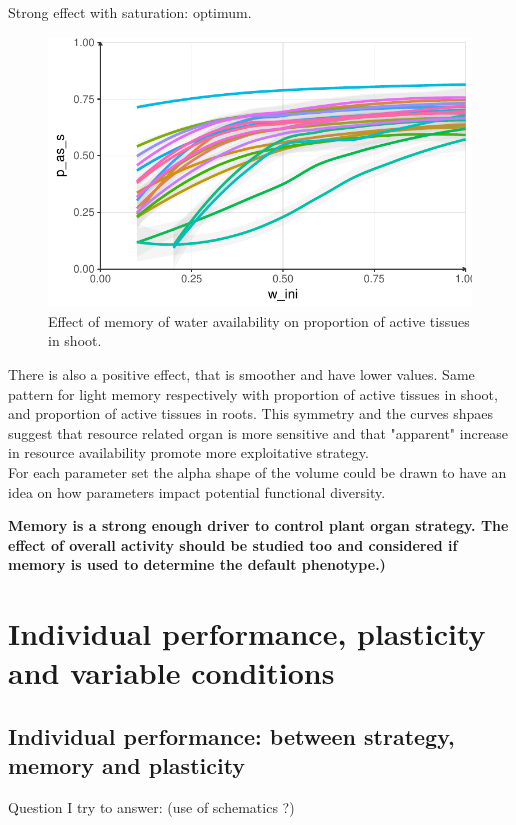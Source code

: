 Strong effect with saturation: optimum. 

\begin{figure}\label{fig:w_ini_p_as_s}
\includegraphics[width = \textwidth]{./2_PP/Figures/w_ini_p_as_s.pdf}
\caption{Effect of memory of water availability on proportion of active tissues in shoot.}
\end{figure}
There is also a positive effect, that is smoother and have lower values. Same pattern for light memory respectively with proportion of active tissues in shoot, and proportion of active tissues in roots. This symmetry and the curves shpaes suggest that resource related organ is more sensitive and that "apparent" increase in resource availability promote more exploitative strategy.\\

For each parameter set the alpha shape of the volume could be drawn to have an idea on how parameters impact potential functional diversity.


\textbf{Memory is a strong enough driver to control plant organ strategy. The effect of overall activity should be studied too and considered if memory is used to determine the default phenotype.)}

\chapter{Individual performance, plasticity and variable conditions}
\section{Individual performance: between strategy, memory and plasticity}

Question I try to answer: (use of schematics ?)


